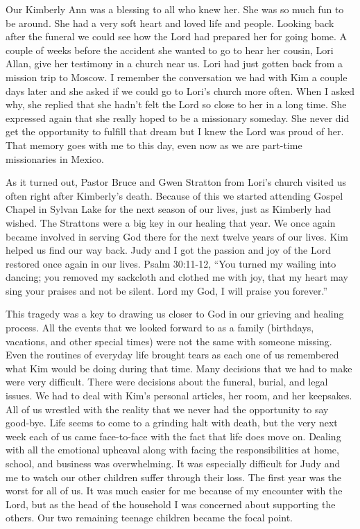 \documentclass[twoside, 12pt]{book}
\begin{document}
Our Kimberly Ann was a blessing to all who knew her. She was so much fun to be around. She had a very soft heart and loved life and people. Looking back after the funeral we could see how the Lord had prepared her for going home. A couple of weeks before the accident she wanted to go to hear her cousin, Lori Allan, give her testimony in a church near us. Lori had just gotten back from a mission trip to Moscow. I remember the conversation we had with Kim a couple days later and she asked if we could go to Lori's church more often. When I asked why, she replied that she hadn't felt the Lord so close to her in a long time. She expressed again that she really hoped to be a missionary someday. She never did get the opportunity to fulfill that dream but I knew the Lord was proud of her. That memory goes with me to this day, even now as we are part-time missionaries in Mexico.

As it turned out, Pastor Bruce and Gwen Stratton from Lori's church visited us often right after Kimberly’s death. Because of this we started attending Gospel Chapel in Sylvan Lake for the next season of our lives, just as Kimberly had wished. The Strattons were a big key in our healing that year. We once again became involved in serving God there for the next twelve years of our lives. Kim helped us find our way back. Judy and I got the passion and joy of the Lord restored once again in our lives. Psalm 30:11-12, “You turned my wailing into dancing; you removed my sackcloth and clothed me with joy, that my heart may sing your praises and not be silent. Lord my God, I will praise you forever.”

This tragedy was a key to drawing us closer to God in our grieving and healing process. All the events that we looked forward to as a family (birthdays, vacations, and other special times)  were not the same with someone missing. Even the routines of everyday life brought tears as each one of us remembered what Kim would be doing during that time. Many decisions that we had to make were very difficult. There were decisions about the funeral, burial, and legal issues. We had to deal with Kim's personal articles, her room, and her keepsakes. All of us wrestled with the reality that we never had the opportunity to say good-bye. Life seems to come to a grinding halt with death, but the very next week each of us came face-to-face with the fact that life does move on. Dealing with all the emotional upheaval along with facing the responsibilities at home, school, and business was overwhelming. It was especially difficult for Judy and me to watch our other children suffer through their loss. The first year was the worst for all of us. It was much easier for me because of my encounter with the Lord, but as the head of the household I was concerned about supporting the others. Our two remaining teenage children became the focal point.
\end{document}
